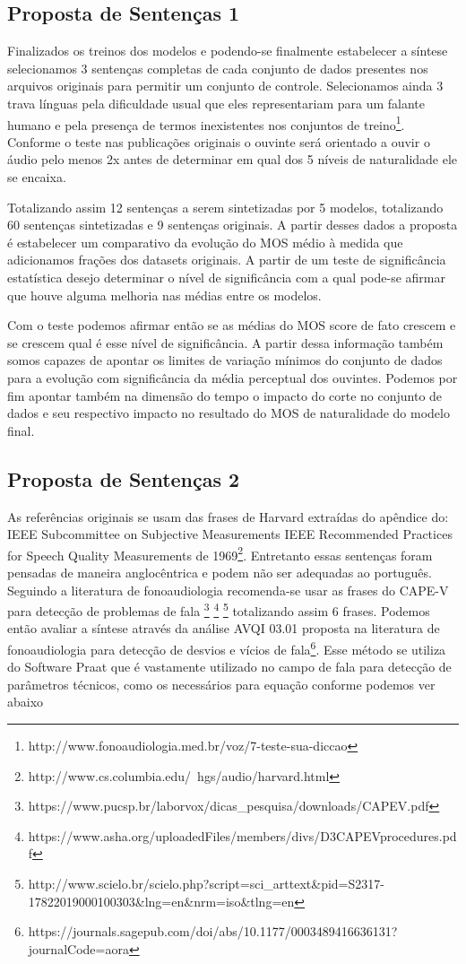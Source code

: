 \documentclass{article}
\begin{document}
\subsection{Proposta de Sentenças 1}
Finalizados os treinos dos modelos e podendo-se finalmente estabelecer a síntese selecionamos 3 sentenças completas de cada conjunto de dados presentes nos arquivos originais para permitir um conjunto de controle. Selecionamos ainda 3 trava línguas pela dificuldade usual que eles representariam para um falante humano e pela presença de termos inexistentes nos conjuntos de treino\footnote{http://www.fonoaudiologia.med.br/voz/7-teste-sua-diccao}. Conforme o teste nas publicações originais o ouvinte será orientado a ouvir o áudio pelo menos 2x antes de determinar em qual dos 5 níveis de naturalidade ele se encaixa.

Totalizando assim 12 sentenças a serem sintetizadas por 5 modelos, totalizando 60 sentenças sintetizadas e 9 sentenças originais. A partir desses dados a proposta é estabelecer um comparativo da evolução do MOS médio à medida que adicionamos frações dos datasets originais. A partir de um teste de significância estatística desejo determinar o nível de significância com a qual pode-se afirmar que houve alguma melhoria nas médias entre os modelos.

Com o teste podemos afirmar então se as médias do MOS score de fato crescem e se crescem qual é esse nível de significância. A partir dessa informação também somos capazes de apontar os limites de variação mínimos do conjunto de dados para a evolução com significância da média perceptual dos ouvintes. Podemos por fim apontar também na dimensão do tempo o impacto do corte no conjunto de dados e seu respectivo impacto no resultado do MOS de naturalidade do modelo final.

\subsection{Proposta de Sentenças 2}
As referências originais se usam das frases de Harvard extraídas do apêndice do: IEEE Subcommittee on Subjective Measurements IEEE Recommended Practices for Speech Quality Measurements de 1969\footnote{http://www.cs.columbia.edu/~hgs/audio/harvard.html}. Entretanto essas sentenças foram pensadas de maneira anglocêntrica e podem não ser adequadas ao português. Seguindo a literatura de fonoaudiologia recomenda-se usar as frases do CAPE-V para detecção de problemas de fala \footnote{https://www.pucsp.br/laborvox/dicas\_pesquisa/downloads/CAPEV.pdf}  \footnote{https://www.asha.org/uploadedFiles/members/divs/D3CAPEVprocedures.pdf} \footnote{http://www.scielo.br/scielo.php?script=sci\_arttext\&pid=S2317-17822019000100303\&lng=en\&nrm=iso\&tlng=en} totalizando assim 6 frases. Podemos então avaliar a síntese através da análise AVQI 03.01 proposta na literatura de fonoaudiologia para detecção de desvios e vícios de fala\footnote{https://journals.sagepub.com/doi/abs/10.1177/0003489416636131?journalCode=aora}. Esse método se utiliza do Software Praat que é vastamente utilizado no campo de fala para detecção de parâmetros técnicos, como os necessários para equação conforme podemos ver abaixo
\end{document}
